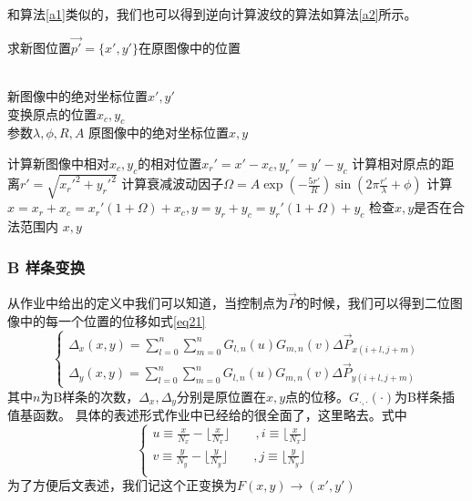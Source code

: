 \documentclass[UTF8,a4paper]{paper}\usepackage[utf8]{inputenc}\usepackage{algorithm}
\begin{document}
和算法\ref{a1}类似的，我们也可以得到逆向计算波纹的算法如算法\ref{a2}所示。
\begin{algorithm}[h]\caption{求新图位置$\vec{p'} = \{x',y'\}$在原图像中的位置}\label{a2}\begin{algorithmic}
    \Require \\ 新图像中的绝对坐标位置$x',y'$\\ 变换原点的位置$x_c,y_c$\\ 参数$\lambda,\phi,R,A$
    \Ensure 原图像中的绝对坐标位置$x,y$\end{algorithmic}\begin{algorithmic}[1]
    \State 计算新图像中相对$x_c,y_c$的相对位置$x_r' = x' - x_c, y_r' = y' - y_c$
    \State 计算相对原点的距离$r' = \sqrt{x_r'^2 + y_r'^2}$
    \State 计算衰减波动因子$\Omega = A\exp(-\frac{5r'}{R})\sin(2\pi\frac{r'}{\lambda}+\phi)$
    \State 计算$x = x_r + x_c = x_r'(1+\Omega) + x_c,y = y_r + y_c = y_r'(1+\Omega) + y_c$
    \State 检查$x,y$是否在合法范围内
    \State \Return $x,y$
    \EndFunction
\end{algorithmic}\end{algorithm}

\subsubsection{B 样条变换}
从作业中给出的定义中我们可以知道，当控制点为$\vec{P}$的时候，我们可以得到二位图像中的每一个位置的位移如式\ref{eq21}
\begin{equation}\begin{cases}
    \displaystyle{ \Delta_x(x,y) = \sum_{l=0}^n\sum_{m=0}^n G_{l,n}(u)G_{m,n}(v)\Delta\vec{P}_{x(i+l,j+m)}} \\ 
    \displaystyle{ \Delta_y(x,y) = \sum_{l=0}^n\sum_{m=0}^n G_{l,n}(u)G_{m,n}(v)\Delta\vec{P}_{y(i+l,j+m)}}
\label{eq21}\end{cases}\end{equation}
其中$n$为B样条的次数，$\Delta_x,\Delta_y$分别是原位置在$x,y$点的位移。$G_{\cdot,\cdot}(\cdot)$为B样条插值基函数。
具体的表述形式作业中已经给的很全面了，这里略去。式中
\begin{equation}\begin{cases}
\displaystyle{u\equiv\frac{x}{N_x} - \biggl\lfloor\frac{x}{N_x}\biggr\rfloor\qquad,
i\equiv\biggl\lfloor\frac{x}{N_x}\biggr\rfloor\qquad} \\ 
\displaystyle{v\equiv\frac{y}{N_y} - \biggl\lfloor\frac{y}{N_y}\biggr\rfloor\qquad,
j\equiv\biggl\lfloor\frac{y}{N_y}\biggr\rfloor\qquad} \\
\end{cases}\end{equation}
为了方便后文表述，我们记这个正变换为$F(x,y) \rightarrow (x',y')$
\end{document}
